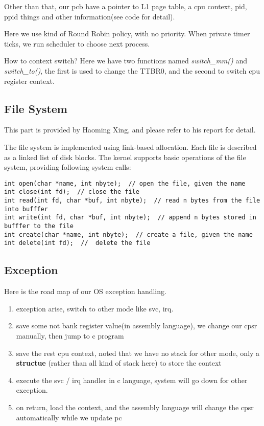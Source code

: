 \documentclass[12pt]{article}
\begin{document}
Other than that, our pcb have a pointer to L1 page table, a cpu context, pid, ppid things and other information(see code \cite{?} for detail).

Here we use kind of Round Robin policy, with no priority. When private timer ticks, we run scheduler to choose next process.

How to context switch? Here we have two functions named \emph{switch\_mm()} and \emph{switch\_to()}, the first is used to change the TTBR0, and the second to switch cpu register context.

\subsection{File System}

This part is provided by Haoming Xing\cite{---todo---}, and please refer to his report for detail.

The file system is implemented using link-based allocation. Each file is described as a linked list of disk blocks. The kernel supports basic operations of the file system, providing following system calls:

\begin{lstlisting}
int open(char *name, int nbyte);  // open the file, given the name
int close(int fd);  // close the file
int read(int fd, char *buf, int nbyte);  // read n bytes from the file into bufffer
int write(int fd, char *buf, int nbyte);  // append n bytes stored in bufffer to the file
int create(char *name, int nbyte);  // create a file, given the name
int delete(int fd);  //  delete the file
\end{lstlisting}


\subsection{Exception}

Here is the road map of our OS exception handling.

\begin{enumerate}
	\item	exception arise, switch to other mode like svc, irq.
	\item	save some not bank register value(in assembly language), we change our cpsr manually, then jump to c program
	\item	save the rest cpu context, noted that we have no stack for other mode, only a \textbf{structue} (rather than all kind of stack here) to store the context
	\item	execute the svc / irq handler in c language, system will go down for other exception.
	\item	on return, load the context, and the assembly language will change the cpsr automatically while we update pc
\end{enumerate}
\end{document}
